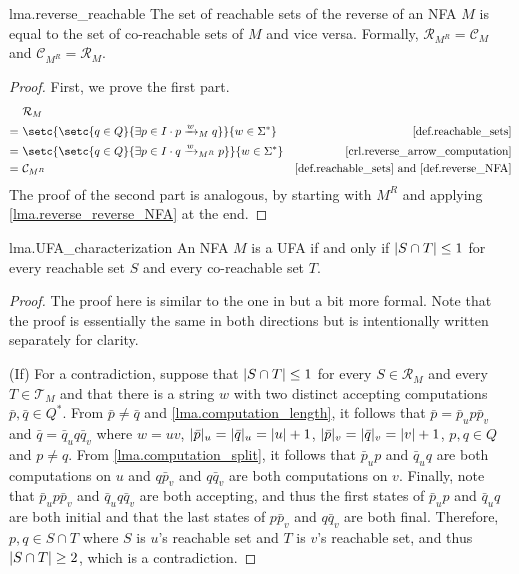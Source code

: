\documentclass{report}
\DeclarePairedDelimiter{\abs}{\lvert}{\rvert}
\theoremstyle{definition}
\begin{document}
\begin{appendices}
\begin{replemma}{lma.reverse_reachable}
The set of reachable sets of the reverse of an NFA $M$ is equal to the set of
co-reachable sets of $M$ and vice versa. Formally,
$\mathcal{R}_{M^R} = \mathcal{C}_M$ and $\mathcal{C}_{M^R} = \mathcal{R}_M$.
\end{replemma}

\begin{proof}
First, we prove the first part.
\begin{align*}
& \mathcal{R}_{M} \\
= \ & \setc{\setc{q \in Q}{\exists p \in I \cdot p \xrightarrow{w}_M q}}
{w \in \Sigma^{\ast}}
& \text{\cref{def.reachable_sets}} \\
= \ & \setc{\setc{q \in Q}{\exists p \in I \cdot q \xrightarrow{w}_{M^R} p}}
{w \in \Sigma^{\ast}} 
& \text{\cref{crl.reverse_arrow_computation}} \\
= \ & \mathcal{C}_{M^R}
& \text{\cref{def.reachable_sets} and \cref{def.reverse_NFA}}
\end{align*}
The proof of the second part is analogous, by starting with $M^R$
and applying \cref{lma.reverse_reverse_NFA} at the end.
\end{proof}

\begin{replemma}{lma.UFA_characterization}
An NFA $M$ is a UFA if and only if $\abs{S \cap T} \leq 1$ for every reachable
set $S$ and every co-reachable set $T$.
\end{replemma}

\begin{proof}
The proof here is similar to the one in \cite{UFA_UB} but a bit more formal. Note
that the proof is essentially the same in both directions but is intentionally
written separately for clarity.

(If) For a contradiction, suppose that $\abs{S \cap T} \leq 1$ for every
$S \in \mathcal{R}_M$ and every $T \in \mathcal{T}_M$ and that there is a string
$w$ with two distinct accepting computations $\bar{p}, \bar{q} \in Q^{\ast}$.
From $\bar{p} \neq \bar{q}$ and \cref{lma.computation_length}, it follows that
$\bar{p} = \bar{p}_u p \bar{p}_v$ and $\bar{q} = \bar{q}_u q \bar{q}_v$ where
$w = uv$, $\abs{\bar{p}}_u = \abs{\bar{q}}_u = \abs{u} + 1$,
$\abs{\bar{p}}_v = \abs{\bar{q}}_v = \abs{v} + 1$, $p, q \in Q$ and
$p \neq q$. From \cref{lma.computation_split}, it follows that $\bar{p}_u p$
and $\bar{q}_u q$ are both computations on $u$ and $q \bar{p}_v$ and $q \bar{q}_v$
are both computations on $v$. Finally, note that $\bar{p}_u p \bar{p}_v$ and
$\bar{q}_u q \bar{q}_v$ are both accepting, and thus the first states of
$\bar{p}_u p$ and $\bar{q}_u q$ are both initial and that the last states of
$p \bar{p}_v$ and $q \bar{q}_v$ are both final. Therefore, $p, q \in S \cap T$
where $S$ is $u$'s reachable set and $T$ is $v$'s reachable set, and thus
$\abs{S \cap T} \geq 2$, which is a contradiction.


\end{proof}
\end{appendices}
\end{document}

